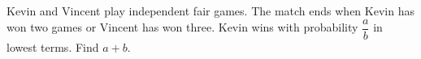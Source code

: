 Kevin and Vincent play independent fair games. The match ends when Kevin has won two games or Vincent has won three. Kevin wins with probability $\dfrac{a}{b}$ in lowest terms. Find $a+b$.
